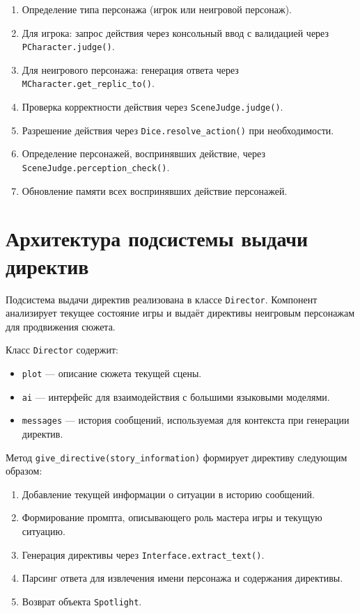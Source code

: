 \begin{enumerate}
	\item Определение типа персонажа (игрок или неигровой персонаж).
	
	\item Для игрока: запрос действия через консольный ввод с валидацией через \texttt{PCharacter.judge()}.
	
	\item Для неигрового персонажа: генерация ответа через \texttt{MCharacter.get\_replic\_to()}.
	
	\item Проверка корректности действия через \texttt{SceneJudge.judge()}.
	
	\item Разрешение действия через \texttt{Dice.resolve\_action()} при необходимости.
	
	\item Определение персонажей, воспринявших действие, через \texttt{SceneJudge.perception\_check()}.
	
	\item Обновление памяти всех воспринявших действие персонажей.
\end{enumerate}

\section{Архитектура подсистемы выдачи директив}

Подсистема выдачи директив реализована в классе \texttt{Director}. Компонент анализирует текущее состояние игры и выдаёт директивы неигровым персонажам для продвижения сюжета.

Класс \texttt{Director} содержит:
\begin{itemize}
	\item \texttt{plot} --- описание сюжета текущей сцены.
	
	\item \texttt{ai} --- интерфейс для взаимодействия с большими языковыми моделями.
	
	\item \texttt{messages} --- история сообщений, используемая для контекста при генерации директив.
\end{itemize}

Метод \texttt{give\_directive(story\_information)} формирует директиву следующим образом:

\begin{enumerate}
	\item Добавление текущей информации о ситуации в историю сообщений.
	
	\item Формирование промпта, описывающего роль мастера игры и текущую ситуацию.
	
	\item Генерация директивы через \texttt{Interface.extract\_text()}.
	
	\item Парсинг ответа для извлечения имени персонажа и содержания директивы.
	
	\item Возврат объекта \texttt{Spotlight}.
\end{enumerate}


